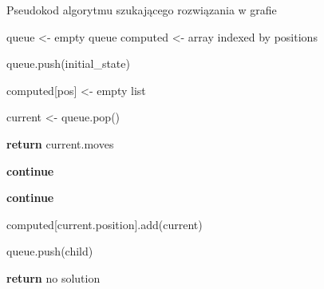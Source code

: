 \begin{algorithm}
    \caption{Pseudokod algorytmu szukającego rozwiązania w grafie}\label{algo:bfs}
    \begin{algorithmic}[1]
        \State queue <- empty queue
        \State computed <- array indexed by positions
        \item[]
        \State queue.push(initial\_state)
        \item[]
        \State computed[pos] <- empty list
        \EndFor
        \item[]

        \State current <- queue.pop()
        \item[]

        \State \textbf{return} current.moves
        \EndIf
        \item[]

        \State \textbf{continue}
        \EndIf
        \item[]

        \State \textbf{continue}
        \EndIf
        \item[]

        \State computed[current.position].add(current)
        \item[]

        \State queue.push(child)
        \EndFor
        \EndWhile
        \item[]

        \State \textbf{return} no solution
        \EndProcedure
    \end{algorithmic}
\end{algorithm}
